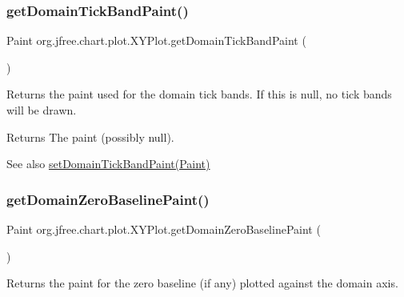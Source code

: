 \subsubsection{\texorpdfstring{get\+Domain\+Tick\+Band\+Paint()}{getDomainTickBandPaint()}}
{\footnotesize\ttfamily Paint org.\+jfree.\+chart.\+plot.\+X\+Y\+Plot.\+get\+Domain\+Tick\+Band\+Paint (\begin{DoxyParamCaption}{ }\end{DoxyParamCaption})}

Returns the paint used for the domain tick bands. If this is {\ttfamily null}, no tick bands will be drawn.

\begin{DoxyReturn}{Returns}
The paint (possibly {\ttfamily null}).
\end{DoxyReturn}
\begin{DoxySeeAlso}{See also}
\mbox{\hyperlink{classorg_1_1jfree_1_1chart_1_1plot_1_1_x_y_plot_ab102d5a43987a1404ce99b0689772132}{set\+Domain\+Tick\+Band\+Paint(\+Paint)}} 
\end{DoxySeeAlso}
\mbox{\label{classorg_1_1jfree_1_1chart_1_1plot_1_1_x_y_plot_ac5e572ae0c60a41e40abfa670caa66e7}} 
\subsubsection{\texorpdfstring{get\+Domain\+Zero\+Baseline\+Paint()}{getDomainZeroBaselinePaint()}}
{\footnotesize\ttfamily Paint org.\+jfree.\+chart.\+plot.\+X\+Y\+Plot.\+get\+Domain\+Zero\+Baseline\+Paint (\begin{DoxyParamCaption}{ }\end{DoxyParamCaption})}

Returns the paint for the zero baseline (if any) plotted against the domain axis.

